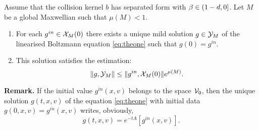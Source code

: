 \begin{theorem}\label{th:exists}
	Assume that the collision kernel $b$ has
	separated form with $\beta\in ( 1-d ,0]$. Let $M$ be a global Maxwellian such 
	that $\mu(M)<1$.
	\begin{enumerate}
	     \item \label{eit:exists}
		For each $g^{in}\in {\mathcal X_M(0)}$ there exists a unique mild solution $g\in {\mathcal Y_M}$
		of the linearised Boltzmann equation \eqref{eq:theone} such that $g(0)=g^{in}$.
		\item  This	solution satisfies the estimation: \[\|g,{\mathcal Y_M}\|\le    \|g^{in},{\mathcal X_M(0)}\|e^{ \mu (M)}. \]
\end{enumerate}
\end{theorem}
\noindent
\textbf{Remark.} If the initial value $g^{in}(x,v)$ belongs to the space ${\mathcal V_0}$, then the unique solution $g(t,x,v)$ of the equation \eqref{eq:theone} with initial data $g(0,x,v) = g^{in}(x,v)$ writes, obviously,\[g(t,x,v)=e^{-tA}[g^{in}(x,v)].\]
